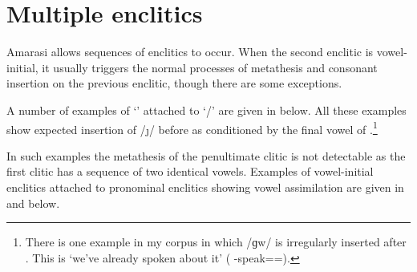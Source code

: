\section{Multiple enclitics}\label{sec:ConInsConIns}
Amarasi allows sequences of enclitics to occur.
When the second enclitic is vowel-initial,
it usually triggers the normal processes of metathesis
and consonant insertion on the previous enclitic,
though there are some exceptions.

A number of examples of  `{\een}'
attached to  `{\ee}/{\eeV}'
are given in  below.
All these examples show expected insertion of /\j/
before  as conditioned by the final vowel of .\footnote{
		There is one example in my corpus in which /ɡw/
		is irregularly inserted after . This is 
		`we've already spoken about it' ({\hai} \mi-speak={\ee=\een}).}

\begin{exe}
\end{exe}

In such examples the metathesis of the penultimate clitic
is not detectable as the first clitic has a sequence of two identical vowels.
Examples of vowel-initial enclitics attached
to pronominal enclitics showing vowel assimilation are given in
 and  below.

